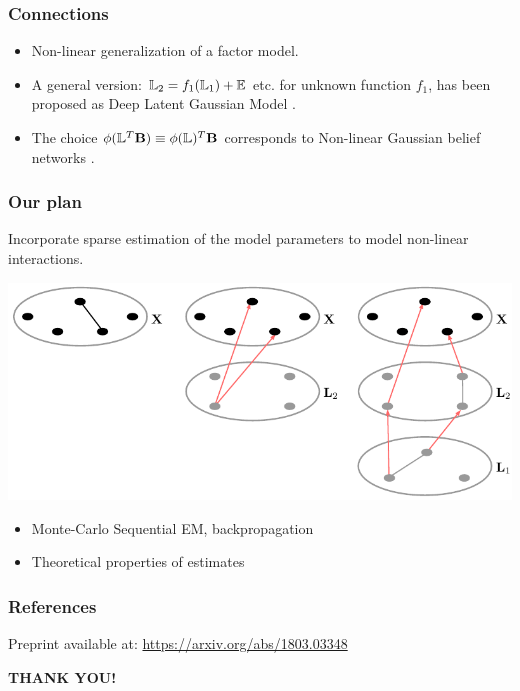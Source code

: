 \documentclass[10pt]{beamer}
\theoremstyle{definition}
\newcommand{\colubf}{\color{UniBlue}\bf}
\begin{document}
\begin{frame}
\frametitle{Connections}

\begin{itemize}
\item Non-linear generalization of a factor model.

\vspace{1em}
\item A general version: ${\mathbb{L}}_2 = f_1({\mathbb{L}}_1) + {\mathbb{E}}$ etc. for unknown function $f_1$, has been proposed as Deep Latent Gaussian Model \citep{RezendeEtal14}.

\vspace{1em}
\item The choice $\phi({\mathbb{L}}^T {\mathbf{B}}) \equiv \phi({\mathbb{L}})^T {\mathbf{B}}$ corresponds to Non-linear Gaussian belief networks \citep{FreyHinton99}.

\end{itemize}
\end{frame}

\begin{frame}
\frametitle{Our plan}

Incorporate {\colbit sparse} estimation of the model parameters to model non-linear interactions.

\begin{center}
\includegraphics[width=.7\textwidth]{latentinteractions}
\end{center}

\begin{itemize}
\item Monte-Carlo Sequential EM, backpropagation
\item Theoretical properties of estimates
\end{itemize}

\end{frame}

\begin{frame}
\frametitle{References}
Preprint available at: \url{https://arxiv.org/abs/1803.03348}

\vspace{1em}
{\scriptsize


}
\end{frame}


\begin{frame}
\centering
{\huge\textcolor{UniBlue}{\textbf{THANK YOU!}}}\\

%
\end{frame}
\end{document}
